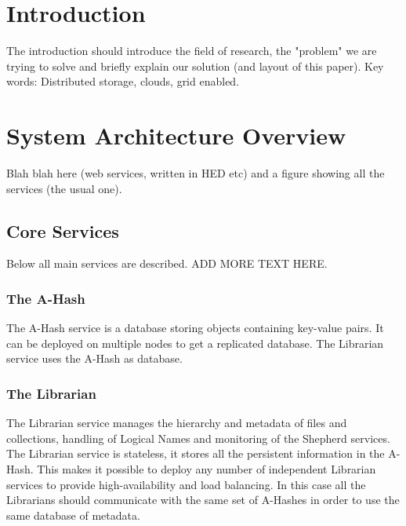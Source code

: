 \documentclass[preprint,12pt]{elsarticle}
\begin{document}

\section{Introduction}
\label{sec:introduction}
The introduction should introduce the field of research, the "problem"
we are trying to solve and briefly explain our solution (and layout of
this paper). Key words: Distributed storage, clouds, grid enabled. 

\section{System Architecture Overview}
\label{sec:systemoverview}
Blah blah here (web services, written in HED etc) and a figure showing
all the services (the usual one).
\subsection{Core Services}
\label{sec:coreservices}
Below all main services are described. ADD MORE TEXT HERE.

\subsubsection{The A-Hash}
\label{sec:theahash}
The A-Hash service is a database storing objects containing key-value
pairs. It can be deployed on multiple nodes to get a replicated
database. The Librarian service uses the A-Hash as database.

\subsubsection{The Librarian}
\label{sec:librarian}
The Librarian service manages the hierarchy and metadata of files and
collections, handling of Logical Names and monitoring of the Shepherd
services. The Librarian service is stateless, it stores all the
persistent information in the A-Hash. This makes it possible to deploy
any number of independent Librarian services to provide
high-availability and load balancing. In this case all the Librarians
should communicate with the same set of A-Hashes in order to use the
same database of metadata.
\end{document}

